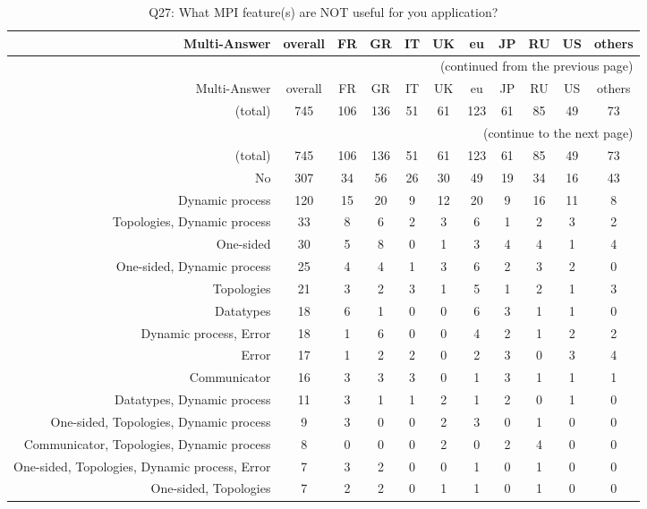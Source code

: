 \clearpage%
{\footnotesize\begin{landscape}%
\begin{longtable}[htb]{r|c|c|c|c|c|c|c|c|c|c}%
\caption{Q27: What MPI feature(s) are NOT useful for you application?}%
\label{tab:Q27-mans} \\%
\hline%
Multi-Answer & overall & FR & GR & IT & UK & eu & JP & RU & US & others \\
 \hline%
\endfirsthead%
\multicolumn{11}{r}{(continued from the previous page)}\\%
\hline%
Multi-Answer & overall & FR & GR & IT & UK & eu & JP & RU & US & others \\
 \hline%
\endhead%
\hline%
(total) & 745 & 106 & 136 & 51 & 61 & 123 & 61 & 85 & 49 & 73 \\%
\hline%
\multicolumn{11}{r}{(continue to the next page)}\\%
\endfoot%
\hline%
(total) & 745 & 106 & 136 & 51 & 61 & 123 & 61 & 85 & 49 & 73 \\%
\hline%
\endlastfoot%
\hline%
{No} & 307 & 34 & 56 & 26 & 30 & 49 & 19 & 34 & 16 & 43 \\%
{Dynamic process} & 120 & 15 & 20 & 9 & 12 & 20 & 9 & 16 & 11 & 8 \\%
{Topologies, Dynamic process} & 33 & 8 & 6 & 2 & 3 & 6 & 1 & 2 & 3 & 2 \\%
{One-sided} & 30 & 5 & 8 & 0 & 1 & 3 & 4 & 4 & 1 & 4 \\%
{One-sided, Dynamic process} & 25 & 4 & 4 & 1 & 3 & 6 & 2 & 3 & 2 & 0 \\%
{Topologies} & 21 & 3 & 2 & 3 & 1 & 5 & 1 & 2 & 1 & 3 \\%
{Datatypes} & 18 & 6 & 1 & 0 & 0 & 6 & 3 & 1 & 1 & 0 \\%
{Dynamic process, Error} & 18 & 1 & 6 & 0 & 0 & 4 & 2 & 1 & 2 & 2 \\%
{Error} & 17 & 1 & 2 & 2 & 0 & 2 & 3 & 0 & 3 & 4 \\%
{Communicator} & 16 & 3 & 3 & 3 & 0 & 1 & 3 & 1 & 1 & 1 \\%
{Datatypes, Dynamic process} & 11 & 3 & 1 & 1 & 2 & 1 & 2 & 0 & 1 & 0 \\%
{One-sided, Topologies, Dynamic process} & 9 & 3 & 0 & 0 & 2 & 3 & 0 & 1 & 0 & 0 \\%
{Communicator, Topologies, Dynamic process} & 8 & 0 & 0 & 0 & 2 & 0 & 2 & 4 & 0 & 0 \\%
{One-sided, Topologies, Dynamic process, Error} & 7 & 3 & 2 & 0 & 0 & 1 & 0 & 1 & 0 & 0 \\%
{One-sided, Topologies} & 7 & 2 & 2 & 0 & 1 & 1 & 0 & 1 & 0 & 0 \\%

\end{longtable}
\end{landscape}}
